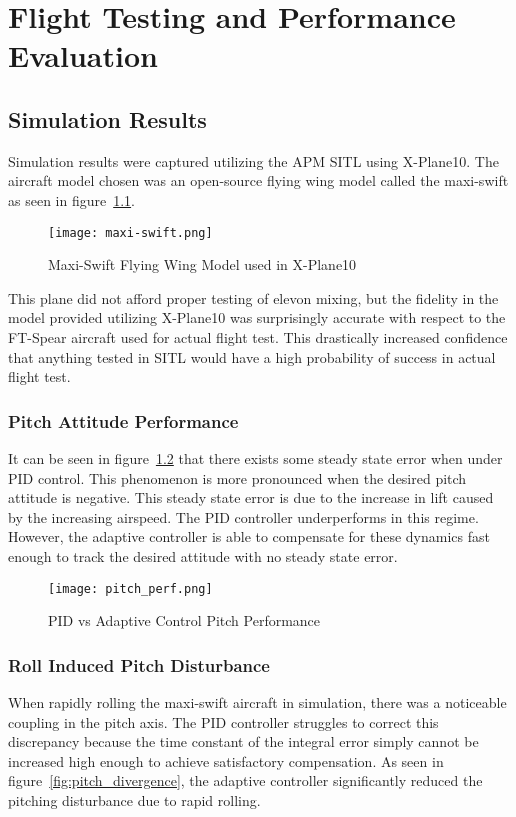 \chapter{Flight Testing and Performance Evaluation}\label{ch:performance}

\section{Simulation Results}
Simulation results were captured utilizing the \ac{APM} \ac{SITL} using X-Plane10.  The aircraft model chosen was an open-source flying wing model called the maxi-swift as seen in figure~\ref{fig:maxi-swift}.

\begin{figure}[!h]
 \centering
  \texttt{[image: maxi-swift.png]}
  \caption{Maxi-Swift Flying Wing Model used in X-Plane10}
  \label{fig:maxi-swift}
\end{figure}
This plane did not afford proper testing of elevon mixing, but the fidelity in the model provided utilizing X-Plane10 was surprisingly accurate with respect to the FT-Spear aircraft used for actual flight test.  This drastically increased confidence that anything tested in \ac{SITL} would have a high probability of success in actual flight test.



\subsection{Pitch Attitude Performance}

It can be seen in figure~\ref{fig:pitch_perf} that there exists some steady state error when under \ac{PID} control.  This phenomenon is more pronounced when the desired pitch attitude is negative.  This steady state error is due to the increase in lift caused by the increasing airspeed.  The \ac{PID} controller underperforms in this regime.  However, the adaptive controller is able to compensate for these dynamics fast enough to track the desired attitude with no steady state error.

\begin{figure}[h!]
 \centering
  \texttt{[image: pitch\_perf.png]}
  \caption{PID vs \Lone Adaptive Control Pitch Performance}
  \label{fig:pitch_perf}
\end{figure}

\subsection{Roll Induced Pitch Disturbance}
When rapidly rolling the maxi-swift aircraft in simulation, there was a noticeable coupling in the pitch axis.  The \ac{PID} controller struggles to correct this discrepancy because the time constant of the integral error simply cannot be increased high enough to achieve satisfactory compensation.  As seen in figure~\ref{fig:pitch_divergence}, the \Lone adaptive controller significantly reduced the pitching disturbance due to rapid rolling.

